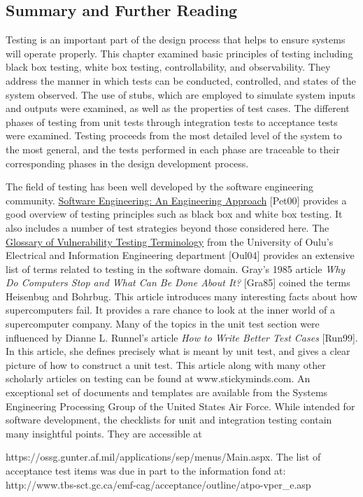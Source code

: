 \subsection{Summary and Further
Reading}\label{summary-and-further-reading}

Testing is an important part of the design process that helps to ensure
systems will operate properly. This chapter examined basic principles of
testing including black box testing, white box testing, controllability,
and observability. They address the manner in which tests can be
conducted, controlled, and states of the system observed. The use of
stubs, which are employed to simulate system inputs and outputs were
examined, as well as the properties of test cases. The different phases
of testing from unit tests through integration tests to acceptance tests
were examined. Testing proceeds from the most detailed level of the
system to the most general, and the tests performed in each phase are
traceable to their corresponding phases in the design development
process.

The field of testing has been well developed by the software engineering
community. \ul{Software Engineering: An Engineering Approach}
{[}Pet00{]} provides a good overview of testing principles such as black
box and white box testing. It also includes a number of test strategies
beyond those considered here. The \ul{Glossary of Vulnerability Testing
Terminology} from the University of Oulu's Electrical and Information
Engineering department {[}Oul04{]} provides an extensive list of terms
related to testing in the software domain. Gray's 1985 article \emph{Why
Do Computers Stop and What Can Be Done About It?} {[}Gra85{]} coined the
terms Heisenbug and Bohrbug. This article introduces many interesting
facts about how supercomputers fail. It provides a rare chance to look
at the inner world of a supercomputer company. Many of the topics in the
unit test section were influenced by Dianne L. Runnel's article
\emph{How to Write Better Test Cases} {[}Run99{]}. In this article, she
defines precisely what is meant by unit test, and gives a clear picture
of how to construct a unit test. This article along with many other
scholarly articles on testing can be found at www.stickyminds.com. An
exceptional set of documents and templates are available from the
Systems Engineering Processing Group of the United States Air Force.
While intended for software development, the checklists for unit and
integration testing contain many insightful points. They are accessible
at

https://ossg.gunter.af.mil/applications/sep/menus/Main.aspx. The list of
acceptance test items was due in part to the information fond at:
http://www.tbs-sct.gc.ca/emf-cag/acceptance/outline/atpo-vper\_e.asp
